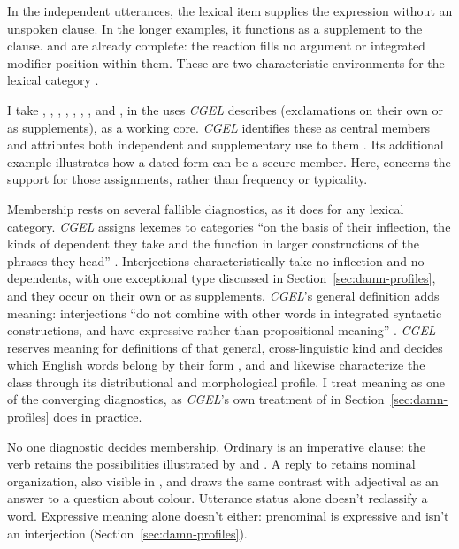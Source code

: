 \documentclass[12pt]{article}
\begin{document}
In the independent utterances, the lexical item supplies the expression
without an unspoken clause. In the longer examples, it functions as
a supplement to the clause.  and  are already complete: the reaction fills no argument or integrated
modifier position within them. These are two characteristic environments
for the lexical category .

I take , , , ,
, , , and , in the uses
\textit{CGEL} describes (exclamations on their own or as supplements), as a
working core. \textit{CGEL}
identifies these as central members and attributes both independent and
supplementary use to them \citep[1361]{HuddlestonPullum2002}. Its
additional example  illustrates how a dated form can be a
secure member. Here,  concerns the support for those
assignments, rather than frequency or typicality.

Membership rests on several fallible diagnostics, as it does for any
lexical category. \textit{CGEL} assigns lexemes to categories \enquote{on
the basis of their inflection, the kinds of dependent they take and the
function in larger constructions of the phrases they head}
\citep[30]{HuddlestonPullum2002}. Interjections characteristically take no
inflection \citep[106]{ameka1992} and no dependents, with one exceptional
type discussed in Section~\ref{sec:damn-profiles}, and they occur on their
own or as supplements. \textit{CGEL}'s general definition adds meaning:
interjections \enquote{do not combine with other words in integrated
syntactic constructions, and have expressive rather than propositional
meaning} \citep[1361]{HuddlestonPullum2002}. \textit{CGEL} reserves meaning
for definitions of that general, cross-linguistic kind and decides which
English words belong by their form \citep[31--32]{HuddlestonPullum2002},
and \textcite[105--106]{ameka1992} and \textcite[124--125]{wilkins1992}
likewise characterize the class through its distributional and
morphological profile. I treat meaning as one of the converging diagnostics,
as \textit{CGEL}'s own treatment of  in
Section~\ref{sec:damn-profiles} does in practice.

No one diagnostic decides membership. Ordinary  is an
imperative clause: the verb retains the possibilities illustrated by
 and . A reply 
to  retains nominal organization, also
visible in , and \textcite[124--125]{wilkins1992}
draws the same contrast with adjectival  as an answer to a
question about colour. Utterance status alone doesn't reclassify a word.
Expressive meaning alone doesn't either: prenominal  is
expressive and isn't an interjection (Section~\ref{sec:damn-profiles}).
\end{document}
